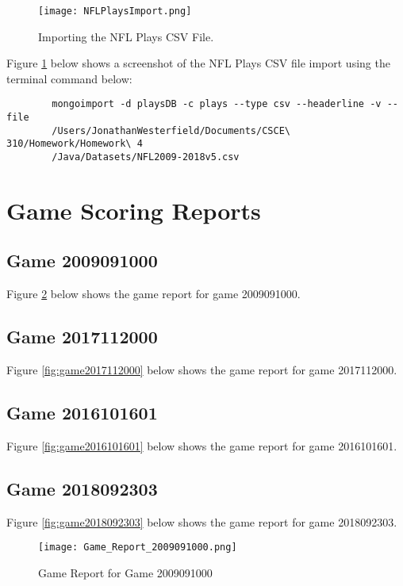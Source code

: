 \documentclass [a4paper,12pt] {article}
\begin{document}
    \begin{figure}
        \texttt{[image: NFLPlaysImport.png]}
        \caption{Importing the NFL Plays CSV File.}
        \label{fig:import1}
    \end{figure} 

    Figure \ref{fig:import1} below shows a screenshot of the NFL Plays CSV file import
    using the terminal command below:

    \begin{verbatim}
        mongoimport -d playsDB -c plays --type csv --headerline -v --file 
        /Users/JonathanWesterfield/Documents/CSCE\ 310/Homework/Homework\ 4
        /Java/Datasets/NFL2009-2018v5.csv
    \end{verbatim}

\section{Game Scoring Reports}
    \subsection{Game 2009091000}
        Figure \ref{fig:game2009091000} below shows the game report for game 2009091000.

    \subsection{Game 2017112000}
        Figure \ref{fig:game2017112000} below shows the game report for game 2017112000.

    \subsection{Game 2016101601}
        Figure \ref{fig:game2016101601} below shows the game report for game 2016101601.
    
    \subsection{Game 2018092303}
        Figure \ref{fig:game2018092303} below shows the game report for game 2018092303.

    \begin{figure}
        \texttt{[image: Game\_Report\_2009091000.png]}
        \caption{Game Report for Game 2009091000}
        \label{fig:game2009091000}
    \end{figure} 
\end{document}
